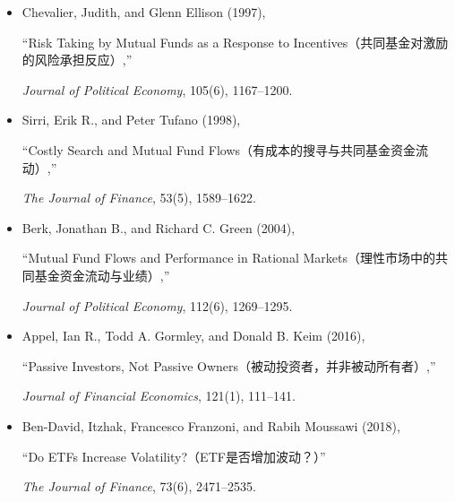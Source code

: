 \begin{itemize}

\item Chevalier, Judith, and Glenn Ellison (1997),

``Risk Taking by Mutual Funds as a Response to Incentives（共同基金对激励的风险承担反应）,''

\emph{Journal of Political Economy}, 105(6), 1167--1200.

\item Sirri, Erik R., and Peter Tufano (1998),

``Costly Search and Mutual Fund Flows（有成本的搜寻与共同基金资金流动）,''

\emph{The Journal of Finance}, 53(5), 1589--1622.

\item Berk, Jonathan B., and Richard C. Green (2004),

``Mutual Fund Flows and Performance in Rational Markets（理性市场中的共同基金资金流动与业绩）,''

\emph{Journal of Political Economy}, 112(6), 1269--1295.

\item Appel, Ian R., Todd A. Gormley, and Donald B. Keim (2016),

``Passive Investors, Not Passive Owners（被动投资者，并非被动所有者）,''

\emph{Journal of Financial Economics}, 121(1), 111--141.

\item Ben-David, Itzhak, Francesco Franzoni, and Rabih Moussawi (2018),

``Do ETFs Increase Volatility?（ETF是否增加波动？）''

\emph{The Journal of Finance}, 73(6), 2471--2535.

\end{itemize}

